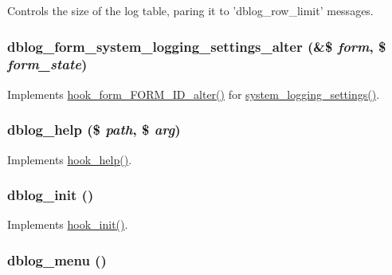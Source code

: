 Controls the size of the log table, paring it to 'dblog\_\-row\_\-limit' messages. \hypertarget{dblog_8module_abb38bc8935acc2b65b46bb556494b10f}{
\subsubsection[{dblog\_\-form\_\-system\_\-logging\_\-settings\_\-alter}]{\setlength{\rightskip}{0pt plus 5cm}dblog\_\-form\_\-system\_\-logging\_\-settings\_\-alter (\&\$ {\em form}, \/  \$ {\em form\_\-state})}}
\label{dblog_8module_abb38bc8935acc2b65b46bb556494b10f}
Implements \hyperlink{group__hooks_ga8d4a4089551493d55911bd5c4f218264}{hook\_\-form\_\-FORM\_\-ID\_\-alter()} for \hyperlink{group__forms_ga3404b7ca761c74436c88ce61aa664c4d}{system\_\-logging\_\-settings()}. \hypertarget{dblog_8module_abda6b8b94cbe15aeb338ed16f5093039}{
\subsubsection[{dblog\_\-help}]{\setlength{\rightskip}{0pt plus 5cm}dblog\_\-help (\$ {\em path}, \/  \$ {\em arg})}}
\label{dblog_8module_abda6b8b94cbe15aeb338ed16f5093039}
Implements \hyperlink{group__hooks_ga5589c2714a782738e8851c4c90231f0e}{hook\_\-help()}. \hypertarget{dblog_8module_a2c66f1df8be0d5bc33f964b3037eb531}{
\subsubsection[{dblog\_\-init}]{\setlength{\rightskip}{0pt plus 5cm}dblog\_\-init ()}}
\label{dblog_8module_a2c66f1df8be0d5bc33f964b3037eb531}
Implements \hyperlink{group__hooks_ga74edef0c463436fdbb1f92ef367db051}{hook\_\-init()}. \hypertarget{dblog_8module_ac599cb2337e45bf5268f593e84039684}{
\subsubsection[{dblog\_\-menu}]{\setlength{\rightskip}{0pt plus 5cm}dblog\_\-menu ()}}
